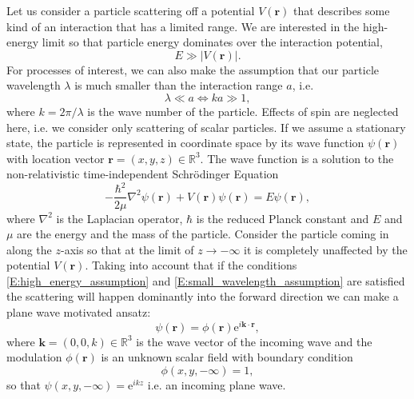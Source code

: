 \documentclass[a4paper, twoside, english, 12pt]{report}
\begin{document}
Let us consider a particle scattering off a potential $V(\mathbf{r})$ that describes some kind of an interaction that has a limited range. We are interested in the high-energy limit so that particle energy dominates over the interaction potential,
\begin{equation}\label{E:high_energy_assumption}
	E\gg|V(\mathbf{r})|.
\end{equation} 
For processes of interest, we can also make the assumption that our particle wavelength $\lambda$ is much smaller than the interaction range $a$, i.e.
\begin{equation}\label{E:small_wavelength_assumption}
	\lambda \ll a \iff ka\gg 1,
\end{equation}
where $k=2\pi/\lambda$ is the wave number of the particle. Effects of spin are neglected here, i.e. we consider only scattering of scalar particles. If we assume a stationary state, the particle is represented in coordinate space by its wave function $\psi(\mathbf{r})$ with location vector $\mathbf{r}=(x,y,z) \in \mathbb{R}^3$. The wave function is a solution to the non-relativistic time-independent Schrödinger Equation \cite[p.144]{griff}
\begin{equation}\label{E:schrode}
	-\frac{\hbar^2}{2\mu}\nabla^2\psi(\mathbf{r}) + V(\mathbf{r})\psi(\mathbf{r}) = E\psi(\mathbf{r}),
\end{equation}
where $\nabla^2$ is the Laplacian operator, $\hbar$ is the reduced Planck constant and $E$ and $\mu$ are the energy and the mass of the particle. Consider the particle coming in along the $z$-axis so that at the limit of $z \to -\infty$ it is completely unaffected by the potential $V(\mathbf{r})$. Taking into account that if the conditions \eqref{E:high_energy_assumption} and \eqref{E:small_wavelength_assumption} are satisfied the scattering will happen dominantly into the forward direction we can make a plane wave motivated ansatz:
\begin{equation}\label{E:planewave}
	\psi(\mathbf{r}) = \phi(\mathbf{r})\mathrm{e}^{i \mathbf{k}\cdot\mathbf{r}},
\end{equation}
where $\mathbf{k}=(0,0,k)\in \mathbb{R}^3$ is the wave vector of the incoming wave and the modulation $\phi(\mathbf{r})$ is an unknown scalar field with boundary condition
\begin{equation}\label{E:BC_for_phi}
\phi(x,y,-\infty)=1,
\end{equation}
so that $\psi(x,y,-\infty) = \mathrm{e}^{i kz}$ i.e. an incoming plane wave.
\end{document}
